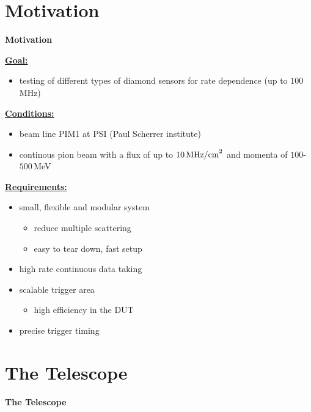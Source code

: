 \documentclass[9pt]{beamer}
\begin{document}
\section{Motivation}
\begin{frame}
	\begin{alertblock}{
		\begin{center}
			\Large{\textbf{Motivation}}
		\end{center}}
	\end{alertblock}
\end{frame}
\begin{frame}
	\underline{\textbf{Goal:}}
	\begin{itemize}
		\item testing of different types of diamond sensors for rate dependence (up to $100$\,MHz)
	\end{itemize}
	\underline{\textbf{Conditions:}}
	\begin{itemize}
		\item beam line PIM1 at PSI (Paul Scherrer institute)
		\item continous pion beam with a flux of up to $10\,\text{MHz/cm}^{2}$ and momenta of $100$-$500$\,MeV
	\end{itemize}
	\underline{\textbf{Requirements:}}
	\begin{itemize}
		\item small, flexible and modular system
		\begin{itemize}
			\item reduce multiple scattering
			\item easy to tear down, fast setup
		\end{itemize}
		\item high rate continuous data taking
		\item scalable trigger area
		\begin{itemize}
			\item high efficiency in the DUT
		\end{itemize}
		\item precise trigger timing
	\end{itemize}
\end{frame}
\section{The Telescope}
\begin{frame}
	\begin{alertblock}{
		\begin{center}
			\Large{\textbf{The Telescope}}
		\end{center}}
	\end{alertblock}
\end{frame}
\end{document}
